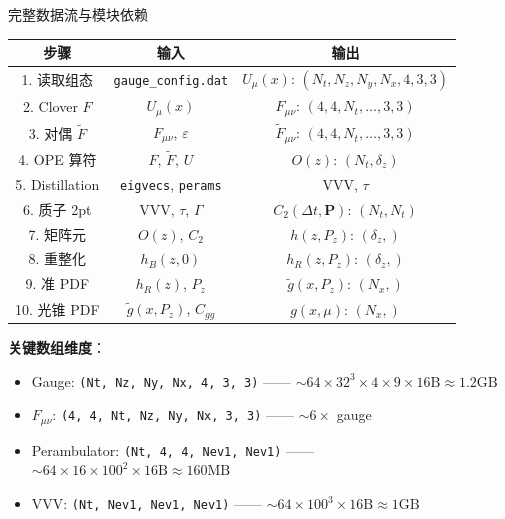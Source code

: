 \documentclass[10pt,aspectratio=169]{beamer}
\newcommand{\Pz}{P_z}
\begin{document}
\begin{frame}{完整数据流与模块依赖}
\small
\begin{center}
\begin{tabular}{c|c|c}
  \toprule
  \textbf{步骤} & \textbf{输入} & \textbf{输出} \\
  \midrule
  1. 读取组态 & \texttt{gauge\_config.dat} & $U_\mu(x)$: $(N_t,N_z,N_y,N_x,4,3,3)$ \\
  2. Clover $F$ & $U_\mu(x)$ & $F_{\mu\nu}$: $(4,4,N_t,\ldots,3,3)$ \\
  3. 对偶 $\tilde{F}$ & $F_{\mu\nu}$, $\varepsilon$ & $\tilde{F}_{\mu\nu}$: $(4,4,N_t,\ldots,3,3)$ \\
  4. OPE 算符 & $F$, $\tilde{F}$, $U$ & $O(z)$: $(N_t, \delta_z)$ \\
  5. Distillation & \texttt{eigvecs}, \texttt{perams} & VVV, $\tau$ \\
  6. 质子 2pt & VVV, $\tau$, $\Gamma$ & $C_2(\Delta t, \mathbf{P})$: $(N_t, N_t)$ \\
  7. 矩阵元 & $O(z)$, $C_2$ & $h(z, \Pz)$: $(\delta_z,)$ \\
  8. 重整化 & $h_B(z, 0)$ & $h_R(z, \Pz)$: $(\delta_z,)$ \\
  9. 准 PDF & $h_R(z)$, $\Pz$ & $\tilde{g}(x, \Pz)$: $(N_x,)$ \\
  10. 光锥 PDF & $\tilde{g}(x, \Pz)$, $C_{gg}$ & $g(x, \mu)$: $(N_x,)$ \\
  \bottomrule
\end{tabular}
\end{center}

\textbf{关键数组维度}：
\begin{itemize}
  \item Gauge: \texttt{(Nt, Nz, Ny, Nx, 4, 3, 3)} —— $\sim 64\times32^3\times4\times9 \times 16\text{B} \approx 1.2\text{GB}$
  \item $F_{\mu\nu}$: \texttt{(4, 4, Nt, Nz, Ny, Nx, 3, 3)} —— $\sim 6\times$ gauge
  \item Perambulator: \texttt{(Nt, 4, 4, Nev1, Nev1)} —— $\sim 64\times16\times100^2 \times 16\text{B} \approx 160\text{MB}$
  \item VVV: \texttt{(Nt, Nev1, Nev1, Nev1)} —— $\sim 64\times100^3 \times 16\text{B} \approx 1\text{GB}$
\end{itemize}
\end{frame}
\end{document}
